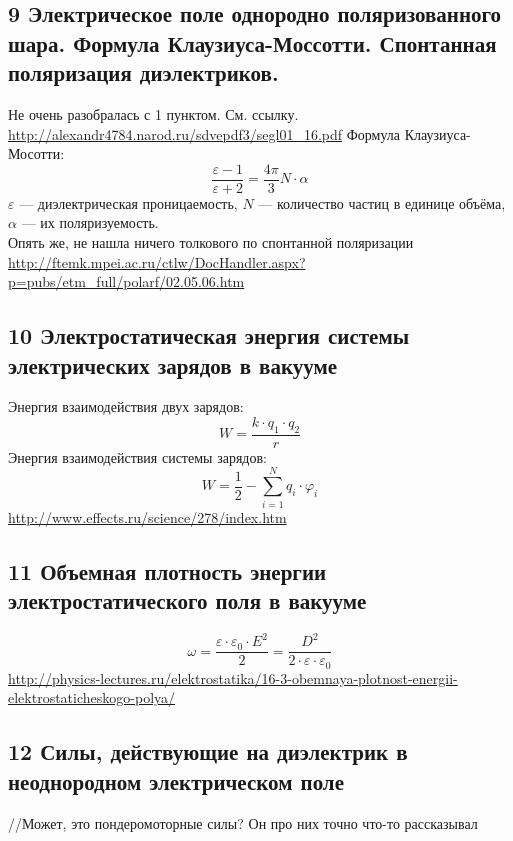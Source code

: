\documentclass[a4paper,12pt]{article}
\begin{document}
\subsection{9   Электрическое поле однородно поляризованного шара. Формула Клаузиуса-Моссотти. Спонтанная поляризация диэлектриков.}
Не очень разобралась с 1 пунктом. См. ссылку.\\
\url{http://alexandr4784.narod.ru/sdvepdf3/segl01_16.pdf}
Формула Клаузиуса-Мосотти:\\
\begin{equation}
	\frac{\varepsilon - 1}{\varepsilon + 2} = \frac{4 \pi}{3} N \cdot \alpha
\end{equation}
$\varepsilon$ — диэлектрическая проницаемость, $N$ — количество частиц в единице объёма, $\alpha$ — их поляризуемость.\\
Опять же, не нашла ничего толкового по спонтанной поляризации\\
\url{http://ftemk.mpei.ac.ru/ctlw/DocHandler.aspx?p=pubs/etm_full/polarf/02.05.06.htm}

\subsection{10   Электростатическая энергия системы электрических зарядов в вакууме}
Энергия взаимодействия двух зарядов:\\
\begin{equation}
	W = \frac{k \cdot q_1 \cdot q_2}{r}
\end{equation}
Энергия взаимодействия системы зарядов:\\
\begin{equation}
	W = \frac{1}{2} - \sum _{i = 1} ^N q_i \cdot \varphi _i
\end{equation}
\url{http://www.effects.ru/science/278/index.htm}

\subsection{11	Объемная плотность энергии электростатического поля в вакууме}
\begin{equation}
	\omega = \frac{\varepsilon \cdot \varepsilon _0 \cdot E^2}{2} = \frac{D^2}{2 \cdot \varepsilon \cdot \varepsilon _0}
\end{equation}
\url{http://physics-lectures.ru/elektrostatika/16-3-obemnaya-plotnost-energii-elektrostaticheskogo-polya/}

\subsection{12   Силы, действующие на диэлектрик в неоднородном электрическом поле}
//Может, это пондеромоторные силы? Он про них точно что-то рассказывал
\end{document}
